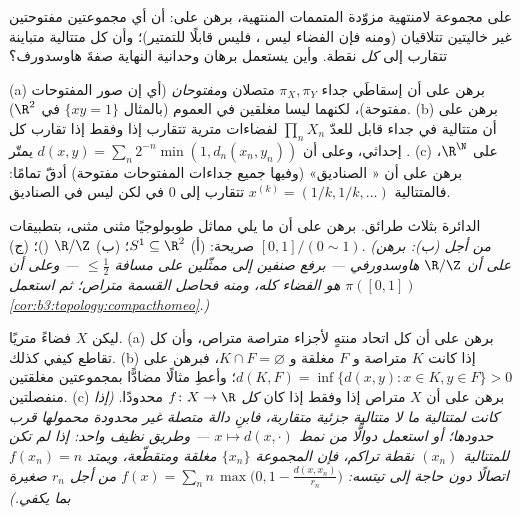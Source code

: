 \begin{exercise}[$\star$]\label{exo:b3:topology:3}
على مجموعة لامنتهية مزوّدة  المتممات المنتهية، برهن
على: أن أي مجموعتين مفتوحتين غير خاليتين تتلاقيان (ومنه فإن
الفضاء ليس ، فليس قابلًا للتمتير)؛ وأن كل متتالية
متباينة تتقارب إلى \emph{كل} نقطة. وأين يستعمل برهان وحدانية
النهاية صفةَ هاوسدورف؟
\end{exercise}

\begin{exercise}[$\star\star$]\label{exo:b3:topology:4}
(a) برهن على أن إسقاطَي جداء $\pi_X, \pi_Y$ متصلان
و\emph{مفتوحان} (أي إن صور المفتوحات مفتوحة)، لكنهما ليسا
مغلقين في العموم (بالمثال $\{xy = 1\}$ في $\R^2$).
(b) برهن على أن متتالية في جداء قابل للعدّ $\prod_n X_n$ لفضاءات
مترية تتقارب إذا وفقط إذا تقارب كل إحداثي، وعلى أن $d(x, y) = \sum_n 2^{-n}\min(1, d_n(x_n, y_n))$ يمتّر
.
(c) على $\R^\N$، برهن على أن « الصناديق» (وفيها جميع
جداءات المفتوحات مفتوحة) أدقّ تمامًا: فالمتتالية $x^{(k)} = (1/k, 1/k, \dots)$ تتقارب
إلى $0$ في  لكن ليس في  الصناديق.
\end{exercise}

\begin{exercise}[$\star\star$]\label{exo:b3:topology:5}
الدائرة بثلاث طرائق. برهن على أن ما يلي مماثل طوبولوجيًا مثنى
مثنى، بتطبيقات صريحة: (أ) $S^1 \subseteq \R^2$؛ (ب) $\R/\Z$ ()؛ (ج) $[0,1]/(0 \sim 1)$. \emph{(من أجل (ب): برهن على أن $\R/\Z$
هاوسدورفي --- برفع صنفين إلى ممثّلين على مسافة $\leq \frac12$
--- وعلى أن $\pi([0,1])$ هو الفضاء كله، ومنه فحاصل القسمة
متراص؛ ثم استعمل \cref{cor:b3:topology:compacthomeo}.)}
\end{exercise}

\begin{exercise}[$\star\star$]\label{exo:b3:topology:6}
ليكن $X$ فضاءً متريًا.
(a) برهن على أن كل اتحاد منتهٍ لأجزاء متراصة متراص، وأن كل
تقاطع كيفي كذلك.
(b) إذا كانت $K$ متراصة و $F$ مغلقة و $K \cap F = \varnothing$، فبرهن على
$d(K, F) = \inf\{d(x,y) : x \in K, y \in F\} > 0$؛ وأعطِ مثالًا مضادًّا بمجموعتين مغلقتين منفصلتين.
(c) برهن على أن $X$ متراص إذا وفقط إذا كان \emph{كل} 
$f
\colon X \to \R$ محدودًا. \emph{(إذا كانت لمتتالية ما لا متتالية جزئية
متقاربة، فابنِ دالة متصلة غير محدودة محمولها قرب حدودها؛ أو
استعمل دوالًّا من نمط $x \mapsto
d(x, \cdot)$ --- وطريق نظيف واحد: إذا لم تكن
للمتتالية $(x_n)$ نقطة تراكم، فإن المجموعة $\{x_n\}$ مغلقة ومتقطّعة،
ويمتد $f(x_n) = n$ اتصالًا دون حاجة إلى تيتسه:
$f(x) = \sum_n n\,\max\bigl(0, 1 - \frac{d(x, x_n)}{r_n}\bigr)$
من أجل $r_n$ صغيرة بما يكفي.)}
\end{exercise}

